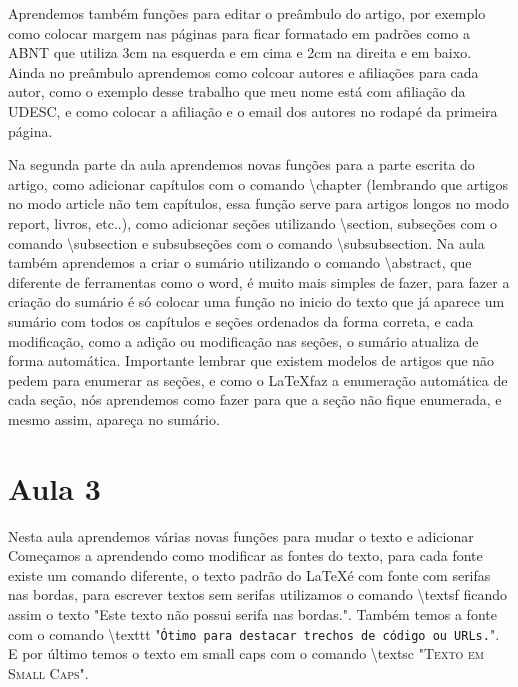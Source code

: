 Aprendemos também funções para editar o preâmbulo do artigo, por exemplo como colocar margem nas páginas para ficar formatado em padrões como a ABNT que utiliza 3cm na esquerda e em cima e 2cm na direita e em baixo. Ainda no preâmbulo aprendemos como colcoar autores e afiliações para cada autor, como o exemplo desse trabalho que meu nome está com afiliação da UDESC, e como colocar a afiliação e o email dos autores no rodapé da primeira página.

Na segunda parte da aula aprendemos novas funções para a parte escrita do artigo, como adicionar capítulos com o comando \textbackslash chapter (lembrando que artigos no modo article não tem capítulos, essa função serve para artigos longos no modo report, livros, etc..), como adicionar seções utilizando \textbackslash section, subseções com o comando \textbackslash subsection e subsubseções com o comando \textbackslash subsubsection. Na aula também aprendemos a criar o sumário utilizando o comando \textbackslash abstract, que diferente de ferramentas como o word, é muito mais simples de fazer, para fazer a criação do sumário é só colocar uma função no inicio do texto que já aparece um sumário com todos os capítulos e seções ordenados da forma correta, e cada modificação, como a adição ou modificação nas seções, o sumário atualiza de forma automática. Importante lembrar que existem modelos de artigos que não pedem para enumerar as seções, e como o \LaTeX faz a enumeração automática de cada seção, nós aprendemos como fazer para que a seção não fique enumerada, e mesmo assim, apareça no sumário.



\section{Aula 3}
Nesta aula aprendemos várias novas funções para mudar o texto e adicionar 
Começamos a aprendendo como modificar as fontes do texto, para cada fonte existe um comando diferente, o texto padrão do \LaTeX é com fonte com serifas nas bordas, para escrever textos sem serifas utilizamos o comando \textbackslash textsf ficando assim o texto "\textsf{Este texto não possui serifa nas bordas.}". Também temos a fonte com o comando \textbackslash texttt "\texttt{Ótimo para destacar trechos de código ou URLs.}". E por último temos o texto em small caps com o comando \textbackslash textsc "\textsc{Texto em Small Caps}".

